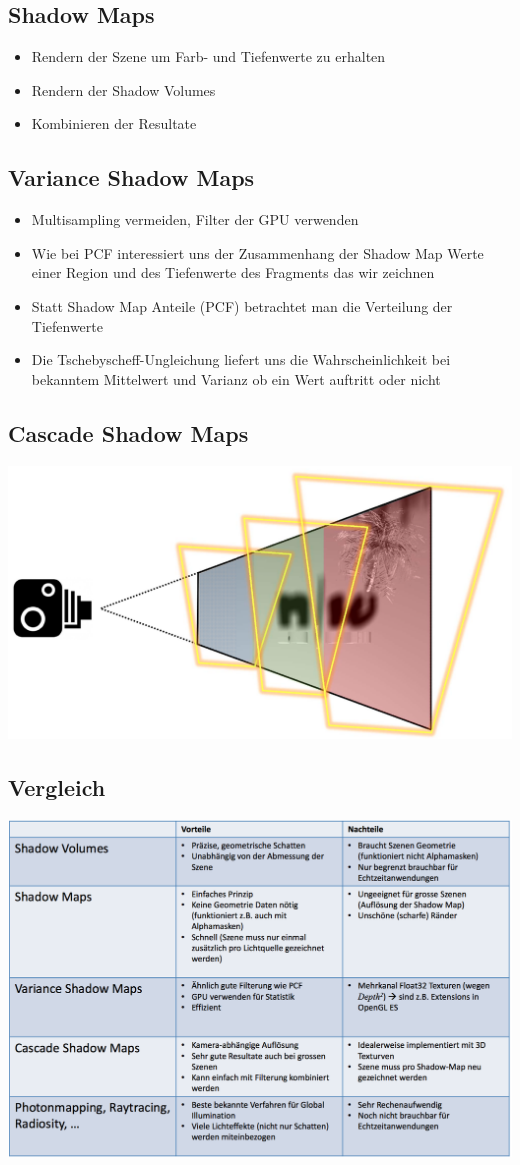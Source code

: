\documentclass[10pt]{article}
\begin{document}
\subsection{Shadow Maps}
\begin{itemize}
	\item Rendern der Szene um Farb- und Tiefenwerte zu erhalten
	\item Rendern der Shadow Volumes
	\item Kombinieren der Resultate
\end{itemize}
\subsection{Variance Shadow Maps}
\begin{itemize}
	\item Multisampling vermeiden, Filter der GPU verwenden
	\item Wie bei PCF interessiert uns der Zusammenhang der Shadow Map Werte einer Region und des Tiefenwerte des Fragments das wir zeichnen
	\item Statt Shadow Map Anteile (PCF) betrachtet man die Verteilung der Tiefenwerte
	\item Die Tschebyscheff-Ungleichung liefert uns die Wahrscheinlichkeit bei bekanntem Mittelwert und Varianz ob ein Wert  auftritt oder nicht
\end{itemize}
\subsection{Cascade Shadow Maps}
\begin{center}
	\includegraphics[scale=0.2]{cascade_shadow_maps.png}
\end{center}
\subsection{Vergleich}
\begin{center}
	\includegraphics[scale=0.4]{shadow_rendering.png}
\end{center}
\end{document}
